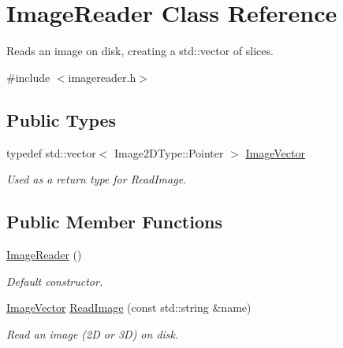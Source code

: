 \hypertarget{class_image_reader}{}\section{Image\+Reader Class Reference}
\label{class_image_reader}


Reads an image on disk, creating a std\+::vector of slices.  




{\ttfamily \#include $<$imagereader.\+h$>$}

\subsection*{Public Types}
\begin{DoxyCompactItemize}
\item 
\mbox{\label{class_image_reader_abc7391a4bfa9f600de693649c105ee1f}} 
typedef std\+::vector$<$ Image2\+D\+Type\+::\+Pointer $>$ \hyperlink{class_image_reader_abc7391a4bfa9f600de693649c105ee1f}{Image\+Vector}
\begin{DoxyCompactList}\small\item\em Used as a return type for Read\+Image. \end{DoxyCompactList}\end{DoxyCompactItemize}
\subsection*{Public Member Functions}
\begin{DoxyCompactItemize}
\item 
\mbox{\label{class_image_reader_a2b24331603b06f5c218212c26a3ee24b}} 
\hyperlink{class_image_reader_a2b24331603b06f5c218212c26a3ee24b}{Image\+Reader} ()
\begin{DoxyCompactList}\small\item\em Default constructor. \end{DoxyCompactList}\item 
\hyperlink{class_image_reader_abc7391a4bfa9f600de693649c105ee1f}{Image\+Vector} \hyperlink{class_image_reader_a58ff32562a6c769c57f4be1bcdf6ca4d}{Read\+Image} (const std\+::string \&name)
\begin{DoxyCompactList}\small\item\em Read an image (2D or 3D) on disk. \end{DoxyCompactList}\end{DoxyCompactItemize}


